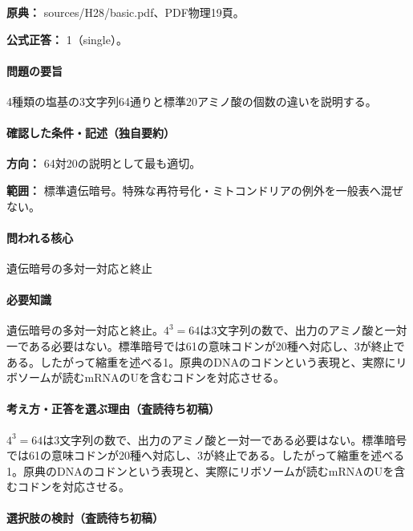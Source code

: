 \noindent\textbf{原典：} sources/H28/basic.pdf、PDF物理19頁。

\textbf{公式正答：} 1（single）。

\paragraph{問題の要旨} 4種類の塩基の3文字列64通りと標準20アミノ酸の個数の違いを説明する。

\paragraph{確認した条件・記述（独自要約）}\mbox{}\par

\noindent\textbf{方向：} 64対20の説明として最も適切。\par

\noindent\textbf{範囲：} 標準遺伝暗号。特殊な再符号化・ミトコンドリアの例外を一般表へ混ぜない。\par

\paragraph{問われる核心} 遺伝暗号の多対一対応と終止

\paragraph{必要知識} 遺伝暗号の多対一対応と終止。\(4^3=64\)は3文字列の数で、出力のアミノ酸と一対一である必要はない。標準暗号では61の意味コドンが20種へ対応し、3が終止である。したがって縮重を述べる1。原典のDNAのコドンという表現と、実際にリボソームが読むmRNAのUを含むコドンを対応させる。

\paragraph{考え方・正答を選ぶ理由（査読待ち初稿）} \(4^3=64\)は3文字列の数で、出力のアミノ酸と一対一である必要はない。標準暗号では61の意味コドンが20種へ対応し、3が終止である。したがって縮重を述べる1。原典のDNAのコドンという表現と、実際にリボソームが読むmRNAのUを含むコドンを対応させる。

\paragraph{選択肢の検討（査読待ち初稿）}\mbox{}\par

